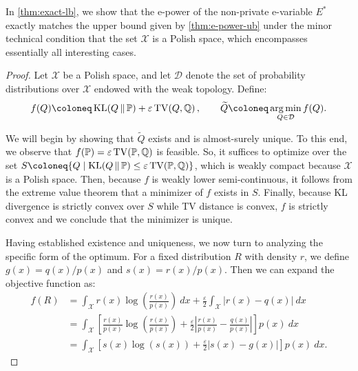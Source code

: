 \documentclass{article}
\DeclareMathOperator{\KLop}{KL}
\newcommand{\KL}[2]{%
  \mathchoice
    {\KLop\!\left(#1\,\middle\|\,#2\right)}%
    {\KLop(#1\,\Vert\,#2)}%
    {\KLop(#1\,\Vert\,#2)}%
    {\KLop(#1\,\Vert\,#2)}%
}
\DeclareMathOperator{\TVop}{TV}
\newcommand{\TV}[2]{
  \mathchoice
    {\TVop\!\left(#1,#2\right)}%
    {\TVop(#1,#2)}%
    {\TVop(#1,#2)}%
    {\TVop(#1,#2)}%
}
\newcommand{\Null}{\mathbb{P}}
\newcommand{\Alt}{\mathbb{Q}}
\newcommand{\eps}{\varepsilon}
\DeclareMathOperator*{\argmin}{\arg\min}
\begin{document}
\vspace{1cm}



In \cref{thm:exact-lb}, we show that the e-power of the non-private e-variable $E^*$ exactly matches the upper bound given by \cref{thm:e-power-ub} under the minor technical condition that the set $\mathcal{X}$ is a Polish space, which encompasses essentially all interesting cases.

\begin{proof}
    Let $\mathcal{X}$ be a Polish space, and let $\mathcal{D}$ denote the set of probability distributions over $\mathcal{X}$ endowed with the weak topology. Define:
    \begin{equation*}
        f(Q) \coloneq \KL{Q}{\Null} + \eps \TV{Q}{\Alt}, \qquad \widetilde Q \coloneq \argmin_{Q \in \mathcal{D}} f(Q).
    \end{equation*}

    We will begin by showing that $\widetilde Q$ exists and is almost-surely unique. To this end, we observe that $f(\Null) = \eps \TV{\Null}{\Alt}$ is feasible. So, it suffices to optimize over the set $S \coloneq\lbrace Q \mid \KL{Q}{\Null} \leq \eps \TV{\Null}{\Alt}\rbrace$, which is weakly compact because $\mathcal{X}$ is a Polish space. Then, because $f$ is weakly lower semi-continuous, it follows from the extreme value theorem that a minimizer of $f$ exists in $S$. Finally, because KL divergence is strictly convex over $S$ while TV distance is convex, $f$ is strictly convex and we conclude that the minimizer is unique.

    Having established existence and uniqueness, we now turn to analyzing the specific form of the optimum. For a fixed distribution $R$ with density $r$, we define $g(x) = q(x)/p(x)$ and $s(x) = r(x)/p(x)$. Then we can expand the objective function as:
    \begin{align*}
        f(R) &= \int_{\mathcal{X}} r(x) \log \left( \frac{r(x)}{p(x)} \right)~dx + \frac{\eps}{2}\int_{\mathcal{X}} |r(x) - q(x)|~dx\\ 
        &= \int_{\mathcal{X}} \left[\frac{r(x)}{p(x)} \log \left( \frac{r(x)}{p(x)} \right) + \frac{\eps}{2}\left| \frac{r(x)}{p(x)} - \frac{q(x)}{p(x)} \right| \right]p(x)~dx \\
        &= \int_{\mathcal{X}} \left[s(x) \log \left( s(x) \right) + \frac{\eps}{2}\left| s(x) - g(x) \right| \right]p(x)~dx.
    \end{align*}


\end{proof}
\end{document}
